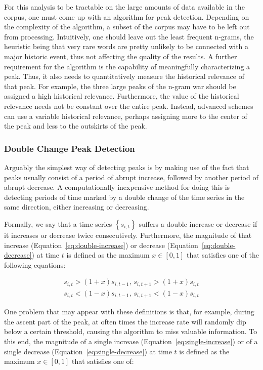 For this analysis to be tractable on the large amounts of data available in the corpus, one must come up with an algorithm for peak detection. Depending on the complexity of the algorithm, a subset of the corpus may have to be left out from processing. Intuitively, one should leave out the least frequent n-grams, the heuristic being that very rare words are pretty unlikely to be connected with a major historic event, thus not affecting the quality of the results. A further requirement for the algorithm is the capability of meaningfully characterizing a peak. Thus, it also needs to quantitatively measure the historical relevance of that peak. For example, the three large peaks of the n-gram war should be assigned a high historical relevance. Furthermore, the value of the historical relevance needs not be constant over the entire peak. Instead, advanced schemes can use a variable historical relevance, perhaps assigning more to the center of the peak and less to the outskirts of the peak.

\subsubsection{Double Change Peak Detection}

Arguably the simplest way of detecting peaks is by making use of the fact that peaks usually consist of a period of abrupt increase, followed by another period of abrupt decrease. A computationally inexpensive method for doing this is detecting periods of time marked by a double change of the time series in the same direction, either increasing or decreasing.

Formally, we say that a time series $\left\{ s_{i, t} \right\}$ suffers a double increase or decrease if it increases or decrease twice consecutively. Furthermore, the magnitude of that increase (Equation~\ref{eq:double-increase}) or decrease (Equation~\ref{eq:double-decrease}) at time $t$ is defined as the maximum $x \in \left[ 0, 1 \right]$ that satisfies one of the following equations:

\begin{align}
\label{eq:double-increase}
s_{i, t} > \left( 1 + x \right) s_{i, t - 1}, \, s_{i, t + 1} > \left( 1 + x \right) s_{i, t}
\\
\label{eq:double-decrease}
s_{i, t} < \left( 1 - x \right) s_{i, t - 1}, \, s_{i, t + 1} < \left( 1 - x \right) s_{i, t}
\end{align}

One problem that may appear with these definitions is that, for example, during the ascent part of the peak, at often times the increase rate will randomly dip below a certain threshold, causing the algorithm to miss valuable information. To this end, the magnitude of a single increase (Equation~\ref{eq:single-increase}) or of a single decrease (Equation~\ref{eq:single-decrease}) at time $t$ is defined as the maximum $x \in \left[ 0, 1 \right]$ that satisfies one of:


